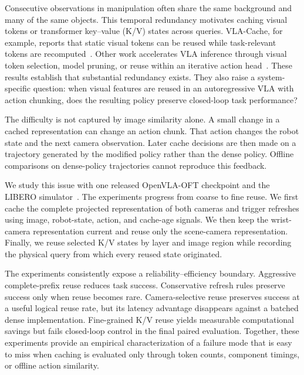 \documentclass[journal]{IEEEtran}
\begin{document}
Consecutive observations in manipulation often share the same background and many of the same objects. This temporal redundancy motivates caching visual tokens or transformer key--value (K/V) states across queries. VLA-Cache, for example, reports that static visual tokens can be reused while task-relevant tokens are recomputed~\cite{xu2025vlacache}. Other work accelerates VLA inference through visual token selection, model pruning, or reuse within an iterative action head~\cite{yang2025efficientvla}. These results establish that substantial redundancy exists. They also raise a system-specific question: when visual features are reused in an autoregressive VLA with action chunking, does the resulting policy preserve closed-loop task performance?

The difficulty is not captured by image similarity alone. A small change in a cached representation can change an action chunk. That action changes the robot state and the next camera observation. Later cache decisions are then made on a trajectory generated by the modified policy rather than the dense policy. Offline comparisons on dense-policy trajectories cannot reproduce this feedback.

We study this issue with one released OpenVLA-OFT checkpoint and the LIBERO simulator~\cite{liu2023libero}. The experiments progress from coarse to fine reuse. We first cache the complete projected representation of both cameras and trigger refreshes using image, robot-state, action, and cache-age signals. We then keep the wrist-camera representation current and reuse only the scene-camera representation. Finally, we reuse selected K/V states by layer and image region while recording the physical query from which every reused state originated.

The experiments consistently expose a reliability--efficiency boundary. Aggressive complete-prefix reuse reduces task success. Conservative refresh rules preserve success only when reuse becomes rare. Camera-selective reuse preserves success at a useful logical reuse rate, but its latency advantage disappears against a batched dense implementation. Fine-grained K/V reuse yields measurable computational savings but fails closed-loop control in the final paired evaluation. Together, these experiments provide an empirical characterization of a failure mode that is easy to miss when caching is evaluated only through token counts, component timings, or offline action similarity.
\end{document}
